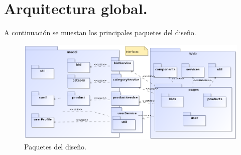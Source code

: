 \documentclass[12pt,a4paper,twoside,spanish]{article}      %
\begin{document}
\section{Arquitectura global.}
A continuación se muestan los principales paquetes del diseño.
\begin{figure}[H]
  \centering
    \includegraphics[width=1\textwidth]{paquetes}
  \caption{Paquetes del diseño.}
  \label{fig:packages}
\end{figure}
\end{document}
